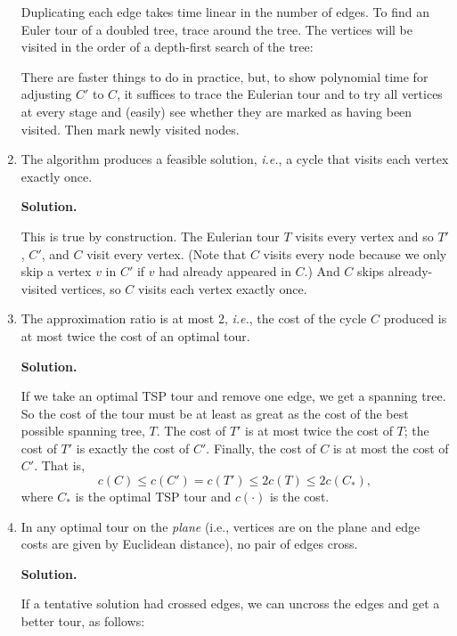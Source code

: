 \documentclass[2pt]{scrartcl}
\newcommand\solution{\textbf{Solution.}}
\begin{document}
\begin{multicols}{6}
\begin{enumerate}
Duplicating each edge takes time linear in the number of edges.  To
find an Euler tour of a doubled tree, trace around the tree.  The
vertices will be visited in the order of a depth-first search of the
tree:

\vspace*{2in}

There are faster things to do in practice, but, to show polynomial
time for adjusting $C'$ to $C$, it suffices to trace the Eulerian tour
and to try all vertices at every stage and (easily) see whether they
are marked as having been visited.  Then mark newly visited nodes.

\item The algorithm produces a feasible solution, {\em i.e.}, a cycle
  that visits each vertex exactly once.

\solution

This is true by construction.  The Eulerian tour $T$ visits every
vertex and so $T'$, $C'$, and $C$ visit every vertex.  (Note that $C$
visits every node because we only skip a vertex $v$ in $C'$ if $v$ had
already appeared in $C$.)  And $C$ skips already-visited vertices, so
$C$ visits each vertex exactly once.

\item The approximation ratio is at most 2, {\em i.e.}, the cost of
  the cycle $C$ produced is at most twice the cost of an optimal tour.

\solution

If we take an optimal TSP tour and remove one edge, we get a spanning
tree.  So the cost of the tour must be at least as great as the cost
of the best possible spanning tree, $T$.  The cost of $T'$ is at most
twice the cost of $T$; the cost of $T'$ is exactly the cost of $C'$.
Finally, the cost of $C$ is at most the cost of $C'$.  That is,
\[c(C)\le c(C')=c(T')\le 2c(T)\le 2c(C_*),\]
where $C_*$ is the optimal TSP tour and $c(\cdot)$ is the cost.

\item In any optimal tour on the {\em plane} (i.e., vertices are on
  the plane and edge costs are given by Euclidean distance), no pair
  of edges cross.

\solution

If a tentative solution had crossed edges, we can uncross the edges
and get a better tour, as follows:


\end{enumerate}
\end{multicols}
\end{document}
